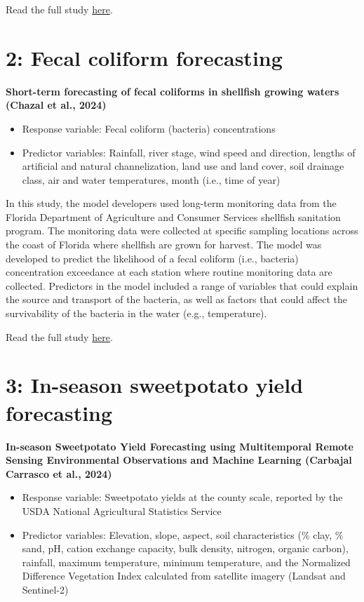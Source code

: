 \documentclass[
]{book}
\providecommand{\tightlist}{%
  \setlength{\itemsep}{0pt}\setlength{\parskip}{0pt}}
\begin{document}
Read the full study \href{https://www.sciencedirect.com/science/article/pii/S1364815223001445?dgcid=author}{here}.

\hypertarget{fecal-coliform-forecasting}{%
\section{2: Fecal coliform forecasting}\label{fecal-coliform-forecasting}}

\textbf{Short-term forecasting of fecal coliforms in shellfish growing waters (Chazal et al., 2024)}

\begin{itemize}
\tightlist
\item
  Response variable: Fecal coliform (bacteria) concentrations
\item
  Predictor variables: Rainfall, river stage, wind speed and direction, lengths of artificial and natural channelization, land use and land cover, soil drainage class, air and water temperatures, month (i.e., time of year)
\end{itemize}

In this study, the model developers used long-term monitoring data from the Florida Department of Agriculture and Consumer Services shellfish sanitation program. The monitoring data were collected at specific sampling locations across the coast of Florida where shellfish are grown for harvest. The model was developed to predict the likelihood of a fecal coliform (i.e., bacteria) concentration exceedance at each station where routine monitoring data are collected. Predictors in the model included a range of variables that could explain the source and transport of the bacteria, as well as factors that could affect the survivability of the bacteria in the water (e.g., temperature).

Read the full study \href{https://doi.org/10.1016/j.marpolbul.2024.116053}{here}.

\hypertarget{in-season-sweetpotato-yield-forecasting}{%
\section{3: In-season sweetpotato yield forecasting}\label{in-season-sweetpotato-yield-forecasting}}

\textbf{In-season Sweetpotato Yield Forecasting using Multitemporal Remote Sensing Environmental Observations and Machine Learning (Carbajal Carrasco et al., 2024)}

\begin{itemize}
\tightlist
\item
  Response variable: Sweetpotato yields at the county scale, reported by the USDA National Agricultural Statistics Service
\item
  Predictor variables: Elevation, slope, aspect, soil characteristics (\% clay, \% sand, pH, cation exchange capacity, bulk density, nitrogen, organic carbon), rainfall, maximum temperature, minimum temperature, and the Normalized Difference Vegetation Index calculated from satellite imagery (Landsat and Sentinel-2)
\end{itemize}
\end{document}
